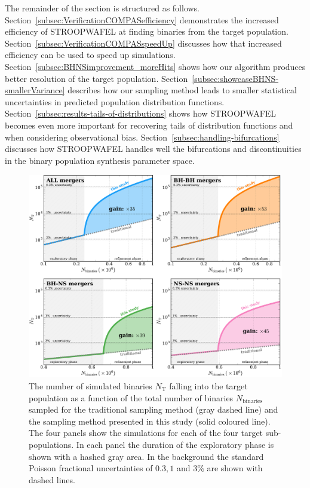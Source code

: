 \documentclass[a4paper,fleqn,usenatbib,useAMS,usedcolumn]{mnras}
\newcommand{\AISs}{\textsc{STROOPWAFEL}}
\begin{document}
The remainder of the section is structured as follows. Section~\ref{subsec:VerificationCOMPASefficiency} demonstrates the increased efficiency of \AISs{} at finding binaries from the target population. Section~\ref{subsec:VerificationCOMPASspeedUp} discusses how that increased efficiency can be used to speed up simulations. Section~\ref{subsec:BHNSimprovement_moreHits} shows how our algorithm produces better resolution of the target population. Section~\ref{subsec:showcaseBHNS-smallerVariance} describes how our sampling method leads to smaller statistical uncertainties in predicted population distribution functions. Section~\ref{subsec:results-tails-of-distributions} shows how \AISs{} becomes even more important for recovering tails of distribution functions and when considering observational bias. 
Section~\ref{subsec:handling-bifurcations} discusses how \AISs{} handles well the bifurcations and discontinuities in the binary population synthesis parameter space. 

%
\begin{figure}
	\includegraphics[width=1\textwidth]{CPUVsUncertaintyZ0_001.pdf} %
    \caption{The number of simulated binaries $N_{\mathrm{T}}$  falling into the target population  as a function of the total number of binaries $N_{\text{binaries}}$ sampled for the traditional sampling method (gray dashed line) and the sampling method presented in this study (solid coloured line). The four panels show the simulations for each of the four target sub-populations. In each panel the duration of the exploratory phase is shown with a hashed gray area.  In the background the standard Poisson fractional uncertainties  of $0.3, 1$ and $3\%$ are shown with  dashed lines. } 
    \label{fig:NbinariesVsNHits}
\end{figure}
%
  
\end{document}
